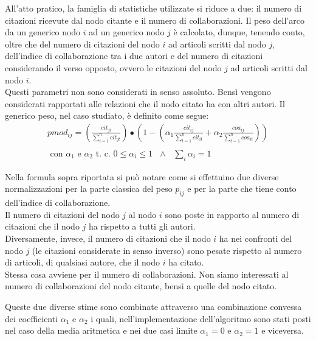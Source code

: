 \documentclass[a4paper, 12pt]{article}
\newcommand{\citazioni}{cit}
\newcommand{\coautori}{coa}
\newcommand{\altroindice}{t}
\newcommand{\pesiPagerankModificato}{pmod}
\begin{document}
\begin{enumerate}
\begin{equation}
  \end{equation}
  \par
  All'atto pratico, la famiglia di statistiche utilizzate si riduce a due: il numero di citazioni ricevute dal nodo citante e il numero di collaborazioni. Il peso dell'arco da un generico nodo $i$ ad un generico nodo $j$ è calcolato, dunque, tenendo conto, oltre che del numero di citazioni del nodo $i$ ad articoli scritti dal nodo $j$, dell'indice di collaborazione tra i due autori e del numero di citazioni considerando il verso opposto, ovvero le citazioni del nodo $j$ ad articoli scritti dal nodo $i$. \\
  Questi parametri non sono considerati in senso assoluto. Bensì vengono considerati rapportati alle relazioni che il nodo citato ha con altri autori.
  Il generico peso, nel caso studiato, è definito come segue:
  \begin{equation}
  \begin{split}
    \pesiPagerankModificato_{ij} = 
    \left( 
      \frac
      {\displaystyle \citazioni_{ji}}
      {\displaystyle \sum_{\altroindice=1}^{n} {\citazioni_{j\altroindice}}}
    \right)
    \bullet
    \left(
      1 - 
      \left(
      \alpha_1
      \frac
      {\displaystyle \citazioni_{ij}}
      {\displaystyle \sum_{\altroindice=1}^{n} {\citazioni_{i\altroindice}}}
      +
      \alpha_2
      \frac
      {\displaystyle \coautori_{ij}}
      {\displaystyle \sum_{\altroindice=1}^{n} {\coautori_{i\altroindice}}}
      \right)
    \right) \\ \\
    \text{ con }
    \alpha_1 \text{ e }  \alpha_2 \text{  t. c. } 0 \leq \alpha_i \leq 1 \text{ } \wedge \text{ } \sum_i {\alpha_i} = 1
  \end{split}
  \end{equation} 

  Nella formula sopra riportata si può notare come si effettuino due diverse normalizzazioni per la parte classica del peso $p_{ij}$ e per la parte che tiene conto dell'indice di collaborazione. \\
  Il numero di citazioni del nodo $j$ al nodo $i$ sono poste in rapporto al numero di citazioni che il nodo $j$ ha rispetto a tutti gli autori. \\
  Diversamente, invece, il numero di citazioni che il nodo $i$ ha nei confronti del nodo $j$ (le citazioni considerate in senso inverso) sono pesate rispetto al numero di articoli, di qualsiasi autore, che il nodo $i$ ha citato. \\
  Stessa cosa avviene per il numero di collaborazioni. Non siamo interessati al numero di collaborazioni del nodo citante, bensì a quelle del nodo citato.
  \par
  Queste due diverse stime sono combinate attraverso una combinazione convessa dei coefficienti $\alpha_1$ e $\alpha_2$ i quali, nell'implementazione dell'algoritmo sono stati posti nel caso della media aritmetica e nei due casi limite $\alpha_1 = 0$ e $\alpha_2 = 1$ e viceversa.  


\end{enumerate}
\end{document}
